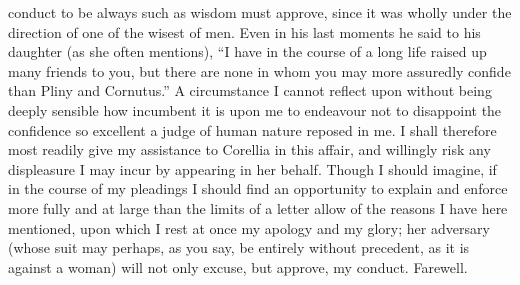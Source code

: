 conduct to be always such as wisdom must approve, since it was wholly
under the direction of one of the wisest of men. Even in his last moments
he said to his daughter (as she often mentions), ``I have in the course of
a long life raised up many friends to you, but there are none in whom you
may more assuredly confide than Pliny and Cornutus.'' A circumstance I
cannot reflect upon without being deeply sensible how incumbent it is upon
me to endeavour not to disappoint the confidence so excellent a judge of
human nature reposed in me. I shall therefore most readily give my
assistance to Corellia in this affair, and willingly risk any displeasure
I may incur by appearing in her behalf. Though I should imagine, if in the
course of my pleadings I should find an opportunity to explain and enforce
more fully and at large than the limits of a letter allow of the reasons I
have here mentioned, upon which I rest at once my apology and my glory;
her adversary (whose suit may perhaps, as you say, be entirely without
precedent, as it is against a woman) will not only excuse, but approve, my
conduct. Farewell.


